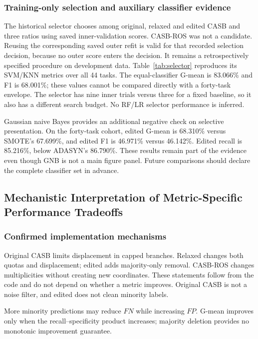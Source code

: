 \documentclass[conference]{IEEEtran}
\begin{document}
\subsubsection{Training-only selection and auxiliary classifier evidence}
The historical selector chooses among original, relaxed and edited CASB and three ratios using saved inner-validation scores. CASB-ROS was not a candidate. Reusing the corresponding saved outer refit is valid for that recorded selection decision, because no outer score enters the decision. It remains a retrospectively specified procedure on development data. Table~\ref{tab:selector} reproduces its SVM/KNN metrics over all 44 tasks. The equal-classifier G-mean is 83.066\% and F1 is 68.001\%; these values cannot be compared directly with a forty-task envelope. The selector has nine inner trials versus three for a fixed baseline, so it also has a different search budget. No RF/LR selector performance is inferred.

Gaussian naive Bayes provides an additional negative check on selective presentation. On the forty-task cohort, edited G-mean is 68.310\% versus SMOTE's 67.699\%, and edited F1 is 46.971\% versus 46.142\%. Edited recall is 85.216\%, below ADASYN's 86.790\%. These results remain part of the evidence even though GNB is not a main figure panel. Future comparisons should declare the complete classifier set in advance.


\FloatBarrier
\subsection{Mechanistic Interpretation of Metric-Specific Performance Tradeoffs}
\subsubsection{Confirmed implementation mechanisms}
Original CASB limits displacement in capped branches. Relaxed changes both quotas and displacement; edited adds majority-only removal. CASB-ROS changes multiplicities without creating new coordinates. These statements follow from the code and do not depend on whether a metric improves. Original CASB is not a noise filter, and edited does not clean minority labels.

More minority predictions may reduce $FN$ while increasing $FP$. G-mean improves only when the recall--specificity product increases; majority deletion provides no monotonic improvement guarantee.
\end{document}
